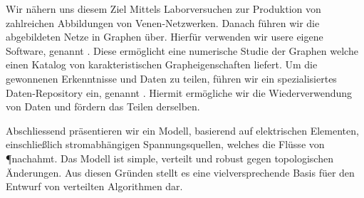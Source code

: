 	Wir n\"ahern uns diesem Ziel Mittels Laborversuchen zur Produktion von zahlreichen Abbildungen von Venen-Netzwerken. Danach f\"uhren wir die abgebildeten Netze in Graphen \"uber. Hierf\"ur verwenden wir usere eigene Software, genannt \NEFI. Diese erm\"oglicht eine numerische Studie der Graphen welche einen Katalog von karakteristischen Grapheigenschaften liefert. Um die gewonnenen Erkenntnisse und Daten zu teilen, f\"uhren wir ein spezialisiertes Daten-Repository ein, genannt \SMGR. Hiermit erm\"ogliche wir die Wiederverwendung von Daten und f\"ordern das Teilen derselben.

	Abschliessend pr\"asentieren wir ein Modell, basierend auf elektrischen Elementen, einschlie{\ss}lich stromabh\"angigen Spannungsquellen, welches die Fl\"usse von \P nachahmt. Das Modell ist simple, verteilt und robust gegen topologischen \"Anderungen. Aus diesen Gr\"unden stellt es eine vielversprechende Basis f\"uer den Entwurf von verteilten Algorithmen dar.


\vfill

